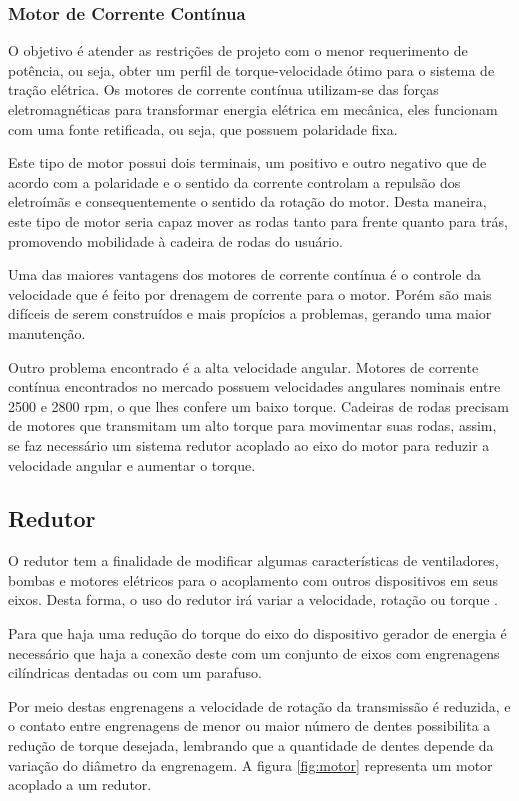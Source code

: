 \subsubsection{Motor de Corrente Contínua}

O objetivo é atender as restrições de projeto com o menor requerimento de potência, ou seja, obter um perfil de torque-velocidade ótimo para o sistema de tração elétrica. Os motores de corrente contínua utilizam-se das forças eletromagnéticas para transformar energia elétrica em mecânica, eles funcionam com uma fonte retificada, ou seja, que possuem polaridade fixa.

Este tipo de motor possui dois terminais, um positivo e outro negativo que de acordo com a polaridade e o sentido da corrente controlam a repulsão dos eletroímãs e consequentemente o sentido da rotação do motor. Desta maneira, este tipo de motor seria capaz mover as rodas tanto para frente quanto para trás, promovendo mobilidade à cadeira de rodas do usuário.

Uma das maiores vantagens dos motores de corrente contínua é o controle da velocidade que é feito por drenagem de corrente para o motor. Porém são mais difíceis de serem construídos e mais propícios a problemas, gerando uma maior manutenção.

Outro problema encontrado é a alta velocidade angular. Motores de corrente contínua encontrados no mercado possuem velocidades angulares nominais entre 2500 e 2800 rpm, o que lhes confere um baixo torque. Cadeiras de rodas precisam de motores que transmitam um alto torque para movimentar suas rodas, assim, se faz necessário um sistema redutor acoplado ao eixo do motor para reduzir a velocidade angular e aumentar o torque.

\subsection{Redutor}

O redutor tem a finalidade de modificar algumas características de ventiladores, bombas e motores elétricos para o acoplamento com outros dispositivos em seus eixos. Desta forma, o uso do redutor irá variar a velocidade, rotação ou torque \cite{apresentacao_andrade}.

Para que haja uma redução do torque do eixo do dispositivo gerador de energia é necessário que haja a conexão deste com um conjunto de eixos com engrenagens cilíndricas dentadas ou com um parafuso.

Por meio destas engrenagens a velocidade de rotação da transmissão é reduzida, e o contato entre engrenagens de menor ou maior número de dentes possibilita a redução de torque desejada, lembrando que a quantidade de dentes depende da variação do diâmetro da engrenagem. A figura \ref{fig:motor} representa um motor acoplado a um redutor.


